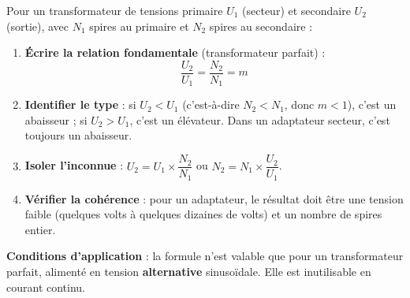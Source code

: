 \documentclass[11pt]{article}
\newcommand{\cle}[1]{{\popxbold\color{popdark}#1}}
\begin{document}
\begin{methode}
Pour un transformateur de tensions primaire $U_1$ (secteur) et secondaire $U_2$ (sortie), avec $N_1$ spires au primaire et $N_2$ spires au secondaire :
\begin{enumerate}
\item \textbf{Écrire la relation fondamentale} (transformateur parfait) :
\[ \frac{U_2}{U_1} = \frac{N_2}{N_1} = m \]
\item \textbf{Identifier le type} : si $U_2 < U_1$ (c'est-à-dire $N_2 < N_1$, donc $m < 1$), c'est un \cle{abaisseur} ; si $U_2 > U_1$, c'est un \cle{élévateur}. Dans un adaptateur secteur, c'est toujours un abaisseur.
\item \textbf{Isoler l'inconnue} : $U_2 = U_1 \times \dfrac{N_2}{N_1}$ ou $N_2 = N_1 \times \dfrac{U_2}{U_1}$.
\item \textbf{Vérifier la cohérence} : pour un adaptateur, le résultat doit être une tension faible (quelques volts à quelques dizaines de volts) et un nombre de spires entier.
\end{enumerate}
\textbf{Conditions d'application} : la formule n'est valable que pour un transformateur parfait, alimenté en tension \textbf{alternative} sinusoïdale. Elle est inutilisable en courant continu.
\end{methode}
\end{document}
